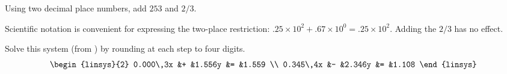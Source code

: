 \begin{exercises}
  \item 
    Using two decimal place numbers, add $253$ and $2/3$.
    \begin{answer}
      Scientific notation is convenient for expressing 
      the two-place restriction:
      $.25\times 10^{2}+.67\times 10^{0}=.25\times 10^{2}$\!.
      Adding the $2/3$ has no effect.
    \end{answer}
\item 
    Solve this system (from \cite{Rice}) by rounding at each step to four digits.
    \begin{equation*}
      \begin{linsys}{2}
        0.000\,3x  &+  &1.556y  &=  &1.559 \\
        0.345\,4x  &-  &2.346y  &=  &1.108
      \end{linsys}
    \end{equation*}
    \begin{answer}

\end{answer}
\end{exercises}
